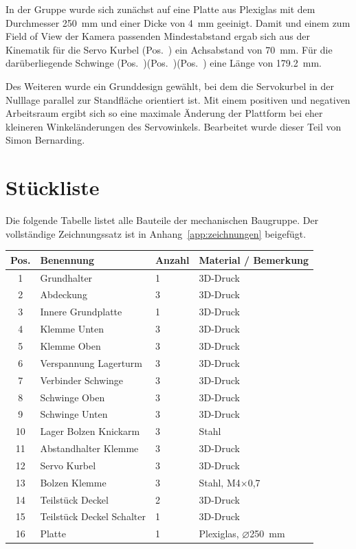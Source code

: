 \documentclass[11pt, a4paper]{scrreprt}
\newcommand{\posnr}[1]{(Pos.~\tikz[baseline=(c.base)]{
    \node[draw,circle,inner sep=0pt,minimum size=2ex] (c)
    {\scriptsize #1};})}
\begin{document}
In der Gruppe wurde sich zunächst auf eine Platte aus Plexiglas mit dem Durchmesser \SI{250}{\milli\metre} und einer Dicke von \SI{4}{\milli\metre} geeinigt. Damit und einem zum Field of View der Kamera passenden Mindestabstand ergab sich aus der Kinematik für die Servo Kurbel \posnr{12} ein Achsabstand von \SI{70}{\milli\metre}. Für die darüberliegende Schwinge \posnr{7}\posnr{8}\posnr{9} eine Länge von \SI{179,2}{\milli\metre}.

Des Weiteren wurde ein Grunddesign gewählt, bei dem die Servokurbel in der Nulllage parallel zur Standfläche orientiert ist. Mit einem positiven und negativen Arbeitsraum ergibt sich so eine maximale Änderung der Plattform bei eher kleineren Winkeländerungen des Servowinkels. Bearbeitet wurde
dieser Teil von Simon Bernarding.

\section{Stückliste}

Die folgende Tabelle listet alle Bauteile der mechanischen Baugruppe. Der vollständige Zeichnungssatz ist in Anhang~\ref{app:zeichnungen} beigefügt.

\begin{center}
\begin{tabular}{clll}
  \toprule
  Pos. & Benennung & Anzahl & Material / Bemerkung \\
  \midrule
  1  & Grundhalter              & 1 & 3D-Druck \\
  2  & Abdeckung                & 3 & 3D-Druck \\
  3  & Innere Grundplatte       & 1 & 3D-Druck \\
  4  & Klemme Unten             & 3 & 3D-Druck \\
  5  & Klemme Oben              & 3 & 3D-Druck \\
  6  & Verspannung Lagerturm    & 3 & 3D-Druck \\
  7  & Verbinder Schwinge       & 3 & 3D-Druck \\
  8  & Schwinge Oben            & 3 & 3D-Druck \\
  9  & Schwinge Unten           & 3 & 3D-Druck \\
  10 & Lager Bolzen Knickarm    & 3 & Stahl \\
  11 & Abstandhalter Klemme     & 3 & 3D-Druck \\
  12 & Servo Kurbel             & 3 & 3D-Druck \\
  13 & Bolzen Klemme            & 3 & Stahl, M4\(\times\)0{,}7 \\
  14 & Teilstück Deckel         & 2 & 3D-Druck \\
  15 & Teilstück Deckel Schalter & 1 & 3D-Druck \\
  16 & Platte                   & 1 & Plexiglas, \(\varnothing\)\SI{250}{\milli\metre} \\
  \bottomrule
\end{tabular}
\end{center}
\end{document}
